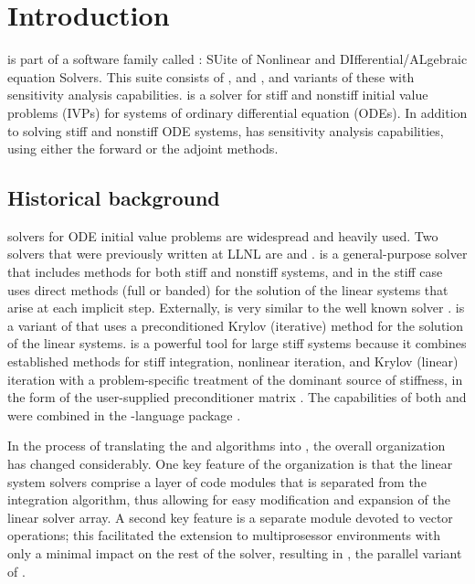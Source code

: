 \chapter{Introduction}\label{s:intro}

{\cvodes} is part of a software family called {\sundials}: 
SUite of Nonlinear and DIfferential/ALgebraic equation Solvers.  
This suite consists of {\cvode}, {\kinsol} and {\ida}, and variants of these
with sensitivity analysis capabilities.
%
{\cvodes} is a solver for stiff and
nonstiff initial value problems (IVPs) for systems of ordinary differential equation
(ODEs). In addition to solving stiff and nonstiff ODE systems, {\cvodes} has sensitivity 
analysis capabilities, using either the forward or the adjoint methods.

\section{Historical background}\label{ss:history}

{\F} solvers for ODE initial value problems are widespread and heavily used. 
Two solvers that were previously written at LLNL are {\vode} \cite{BBH:89} 
and {\vodpk} \cite{Byr:92}.
{\vode} is a general-purpose solver that includes methods for both stiff
and nonstiff systems, and in the stiff case uses direct methods (full or
banded) for the solution of the linear systems that arise at each implicit
step. Externally, {\vode} is very similar to the well known solver
{\lsode} \cite{RaHi:94}.
{\vodpk} is a variant of {\vode} that uses a preconditioned Krylov 
(iterative) method for the solution of the linear systems. {\vodpk} is a powerful 
tool for large stiff systems because it combines established methods for stiff 
integration, nonlinear iteration, and Krylov (linear) iteration with a problem-specific
treatment of the dominant source of stiffness, in the form of the user-supplied
preconditioner matrix \cite{BrHi:89}.
The capabilities of both {\vode} and {\vodpk} were combined in the {\C}-language 
package {\cvode} \cite{CoHi:94, CoHi:96}.

In the process of translating the {\vode} and {\vodpk} algorithms into {\C}, the overall 
{\cvode} organization has changed considerably.
One key feature of the {\cvode} organization is that the linear system solvers comprise a
layer of code modules that is separated from the integration algorithm, thus allowing for 
easy modification and expansion of the linear solver array.
A second key feature is a separate module devoted to vector operations; this 
facilitated the extension to multiprosessor environments with only a minimal impact 
on the rest of the solver, resulting in {\pvode} \cite{ByHi:99}, 
the parallel variant of {\cvode}.

